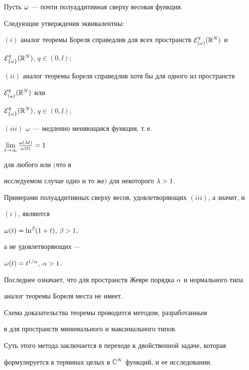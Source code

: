 \begin{thmnonum}


Пусть $\omega$ --- почти полуаддитивная сверху весовая функция.


Следующие утверждения эквивалентны\/${:}$





$(i)$ аналог теоремы Бореля справедлив для всех пространств ${\cal E}_{(\omega)}^q(\Bbb R^N)$ и 


${\cal E}_{\{\omega\}}^q(\Bbb R^N)$, $q\in (0,\ii);$





$(ii)$ аналог теоремы Бореля справедлив хотя бы для одного из пространств 


${\cal E}_{(\omega)}^q(\Bbb R^N)$ или 


${\cal E}_{\{\omega\}}^q(\Bbb R^N)$, $q\in (0,\ii);$





$(iii)$ $\omega$ --- медленно меняющаяся функция, т.\,е.


$\lim\limits_{t\to \infty}\frac{\omega(\lambda t)}{\omega(t)}=1$ 


для любого или $($что в 


исследуемом случае одно и то же$)$ для некоторого $\lambda>1$.


\end{thmnonum}





Примерами полуаддитивных сверху весов, удовлетворяющих $(iii)$, а значит, и 


$(i)$, являются 


$\omega(t)=\ln^{\beta}(1+t)$, $\beta>1$,


а не удовлетворяющих --- 


$\omega(t)=t^{1/\alpha}$, $\alpha>1$.


Последнее означает, что для пространств Жевре порядка $\alpha$ и нормального типа 


аналог теоремы Бореля места не имеет.


\medskip





Схема доказательства теоремы проводится методом, разработанным 


в \cite{Mei88} для пространств минимального и максимального типов. 


Суть этого метода заключается в переходе к двойственной задаче, которая 


формулируется в терминах целых в $\Bbb C^N$ функций, и ее исследовании. 


